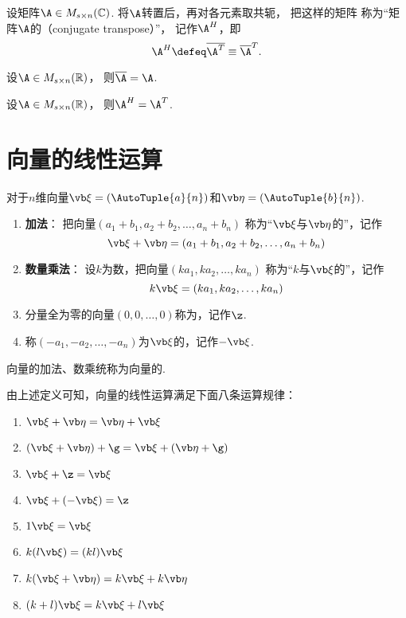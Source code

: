 \begin{definition}
设矩阵\(\A \in M_{s \times n}(\mathbb{C})\).
将\(\A\)转置后，再对各元素取共轭，
把这样的矩阵
称为“矩阵\(\A\)的（conjugate transpose）”，
记作\(\A^H\)，即\[
    \A^H \defeq \overline{\A^T} \equiv \overline{\A}^T.
\]
\end{definition}

\begin{property}
设\(\A \in M_{s \times n}(\mathbb{R})\)，
则\(\overline{\A} = \A\).
\end{property}

\begin{property}
设\(\A \in M_{s \times n}(\mathbb{R})\)，
则\(\A^H = \A^T\).
\end{property}

\section{向量的线性运算}
\begin{definition}
对于\(n\)维向量\(\a = (\AutoTuple{a}{n})\)和\(\b = (\AutoTuple{b}{n})\).
\begin{enumerate}
	\item {\bf 加法}：
	把向量\((a_1+b_1,a_2+b_2,\dotsc,a_n+b_n)\)
	称为“\(\a\)与\(\b\)的”，记作\[
		\a+\b=(a_1+b_1,a_2+b_2,\dotsc,a_n+b_n)
	\]
	\item {\bf 数量乘法}：
	设\(k\)为数，把向量\((k a_1, k a_2, \dotsc, k a_n)\)
	称为“\(k\)与\(\a\)的”，记作\[
		k\a = (k a_1, k a_2, \dotsc, k a_n)
	\]
	\item 分量全为零的向量\((0,0,\dotsc,0)\)称为，记作\(\z\).
	\item 称\((-a_1,-a_2,\dotsc,-a_n)\)为\(\a\)的，记作\(-\a\).
\end{enumerate}

向量的加法、数乘统称为向量的.
\end{definition}

\begin{theorem}
由上述定义可知，向量的线性运算满足下面八条运算规律：
\begin{enumerate}
	\item \(\a + \b = \b + \a\)
	\item \((\a + \b) + \g = \a + (\b + \g)\)
	\item \(\a + \z = \a\)
	\item \(\a + (-\a) = \z\)
	\item \(1 \a = \a\)
	\item \(k(l \a) = (kl) \a\)
	\item \(k(\a + \b) = k\a + k\b\)
	\item \((k+l)\a = k\a + l\a\)
\end{enumerate}
\end{theorem}

